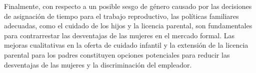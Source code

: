 Finalmente, con respecto a un posible sesgo de género causado por las decisiones de asignación de tiempo para el trabajo reproductivo, las políticas familiares adecuadas, como el cuidado de los hijos y la licencia parental, son fundamentales para contrarrestar las desventajas de las mujeres en el mercado formal. Las mejoras cualitativas en la oferta de cuidado infantil y la extensión de la licencia parental para los padres constituyen opciones potenciales para reducir las desventajas de las mujeres y la discriminación del empleador.